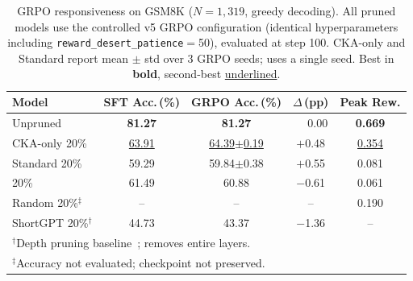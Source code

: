 \begin{table}[t]
\centering
\small
\caption{GRPO responsiveness on GSM8K ($N{=}1{,}319$, greedy decoding). All pruned models use the controlled v5 GRPO configuration (identical hyperparameters including \texttt{reward\_desert\_patience}{$=$}50), evaluated at step 100. CKA-only and Standard report mean $\pm$ std over 3 GRPO seeds; \rasp{} uses a single seed. Best in \textbf{bold}, second-best \underline{underlined}.}
\label{tab:decoupling}
\begin{tabular}{@{}lcccc@{}}
\toprule
Model & SFT Acc.\,(\%) & GRPO Acc.\,(\%) & $\Delta$\,(pp) & Peak Rew. \\
\midrule
Unpruned & \textbf{81.27} & \textbf{81.27} & $\phantom{-}$0.00 & \textbf{0.669} \\
CKA-only 20\% & \underline{63.91} & \underline{64.39{\scriptsize$\pm$0.19}} & $+$0.48 & \underline{0.354} \\
Standard 20\% & 59.29 & 59.84{\scriptsize$\pm$0.38} & $+$0.55 & 0.081 \\
\rasp{} 20\% & 61.49 & 60.88 & $-$0.61 & 0.061 \\
Random 20\%$^\ddagger$ & -- & -- & -- & 0.190 \\
\midrule
ShortGPT 20\%$^\dagger$ & 44.73 & 43.37 & $-$1.36 & -- \\
\bottomrule
\multicolumn{5}{l}{\footnotesize $^\dagger$Depth pruning baseline~\citep{shortgpt2024}; removes entire layers.} \\
\multicolumn{5}{l}{\footnotesize $^\ddagger$Accuracy not evaluated; checkpoint not preserved.}
\end{tabular}
\end{table}
